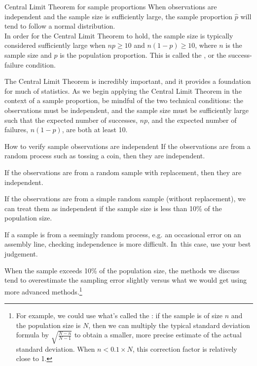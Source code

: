 \begin{onebox}{Central Limit Theorem for sample proportions}
  When observations are independent and the sample size is
  sufficiently large, the sample proportion $\hat{p}$ will tend
  to follow a normal distribution.\\

  In order for the Central Limit Theorem to hold,
  the sample size is typically considered sufficiently large
  when $np \geq 10$ and $n(1-p) \geq 10$, where $n$ is the sample size and $p$ is the population proportion.  This is called the
  , or the success-failure condition.
\end{onebox}


The Central Limit Theorem is incredibly important, and it provides
a foundation for much of statistics.
As we begin applying
the Central Limit Theorem in the context of a sample proportion, be mindful of the two
technical conditions:
the observations must be independent, and the sample size must
be sufficiently large such that the expected number of successes, $np$, and the expected number of failures, $n(1-p)$, are both at least 10.    

\begin{onebox}{How to verify sample observations are independent}
  If the observations are from a random process such as tossing a coin, then they are independent.\stdvspace{}

  If the observations are from a random sample with replacement,
  then they are independent.\stdvspace{}

  If the observations are from a simple random sample (without replacement), we can treat them as independent if the sample size is less than 10\% of the population size.\stdvspace{}

  If a sample is from a seemingly random process,
  e.g. an occasional error on an assembly line,
  checking independence is more difficult. In~this case,
  use your best judgement.
\end{onebox}

When the sample exceeds 10\% of the population size,
the methods we discuss tend to overestimate the sampling error
slightly versus what we would get using more advanced
methods.\footnote{For example, we could use what's called the
  :
  if the sample is of size $n$ and the population size is $N$,
  then we can multiply the typical standard deviation formula by
  $\sqrt{\frac{N-n}{N-1}}$
  to obtain a smaller, more precise estimate of the
  actual standard deviation.
  When $n < 0.1 \times N$, this correction factor is relatively close to 1.}


